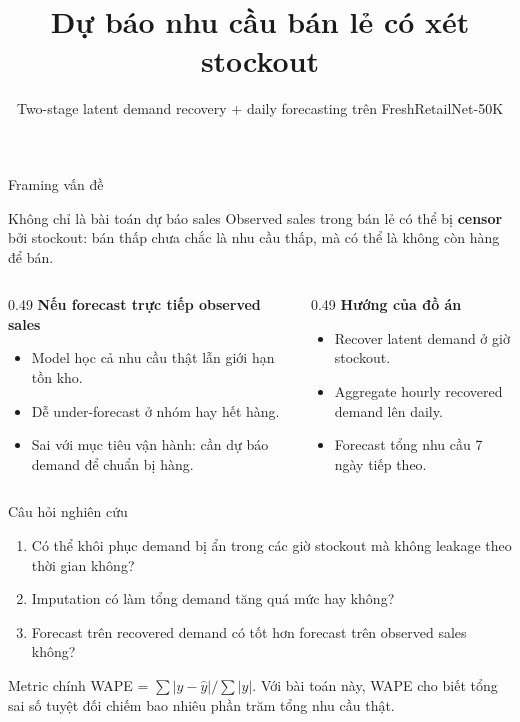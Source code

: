 \documentclass[aspectratio=169,10pt]{beamer}
\title[FreshRetailNet-50K]{Dự báo nhu cầu bán lẻ có xét stockout}
\subtitle{Two-stage latent demand recovery + daily forecasting trên FreshRetailNet-50K}
\author{}
\date{}
\begin{document}
\begin{frame}
    \titlepage
\end{frame}

\begin{frame}{Framing vấn đề}
    \begin{block}{Không chỉ là bài toán dự báo sales}
    Observed sales trong bán lẻ có thể bị \textbf{censor} bởi stockout: bán thấp chưa chắc là nhu cầu thấp, mà có thể là không còn hàng để bán.
    \end{block}
    \vspace{0.15cm}
    \begin{columns}[T]
        \begin{column}{0.49\linewidth}
            \textbf{Nếu forecast trực tiếp observed sales}
            \begin{itemize}
                \item Model học cả nhu cầu thật lẫn giới hạn tồn kho.
                \item Dễ under-forecast ở nhóm hay hết hàng.
                \item Sai với mục tiêu vận hành: cần dự báo demand để chuẩn bị hàng.
            \end{itemize}
        \end{column}
        \begin{column}{0.49\linewidth}
            \textbf{Hướng của đồ án}
            \begin{itemize}
                \item Recover latent demand ở giờ stockout.
                \item Aggregate hourly recovered demand lên daily.
                \item Forecast tổng nhu cầu 7 ngày tiếp theo.
            \end{itemize}
        \end{column}
    \end{columns}
\end{frame}

\begin{frame}{Câu hỏi nghiên cứu}
    \begin{enumerate}
        \item Có thể khôi phục demand bị ẩn trong các giờ stockout mà không leakage theo thời gian không?
        \item Imputation có làm tổng demand tăng quá mức hay không?
        \item Forecast trên recovered demand có tốt hơn forecast trên observed sales không?
    \end{enumerate}
    \vspace{0.25cm}
    \begin{block}{Metric chính}
    WAPE = $\sum |y-\hat{y}| / \sum |y|$. Với bài toán này, WAPE cho biết tổng sai số tuyệt đối chiếm bao nhiêu phần trăm tổng nhu cầu thật.
    \end{block}
\end{frame}
\end{document}
